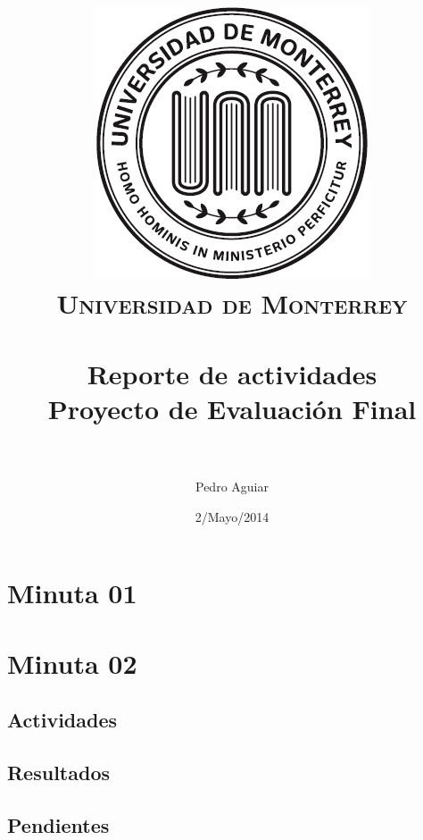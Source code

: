 \documentclass[paper=A4, fontsize=11pt, titlepage]{article}
\title{
\includegraphics[height=0.35\textwidth]{fig/udemlogo}\\
\normalfont \normalsize 
\textsc{Universidad de Monterrey} \\ [25pt] 
\horrule{1pt} \\[0.4cm]
\huge Reporte de actividades \\ 
\small Proyecto de Evaluación Final \\
\horrule{2pt} \\[0.5cm]
}
\author{Pedro Aguiar}
\date{\normalsize 2/Mayo/2014}
\numberwithin{equation}{section}
\numberwithin{figure}{section}
\numberwithin{table}{section}
\newcommand*{\sectionpostamble}{}
\newcommand*{\fromto}[1]{\def\sectionpostamble{#1}}
\begin{document}
\maketitle
\tableofcontents
\clearpage
\listoffigures
\listoftables
\clearpage


\fromto{23 de Abril - 2 de Mayo}
\section{Minuta 01}





\clearpage


\fromto{5 de Mayo - 9 de Mayo}
\section{Minuta 02}

\subsection{Actividades}
\subsection{Resultados}
\subsection{Pendientes}
\end{document}
